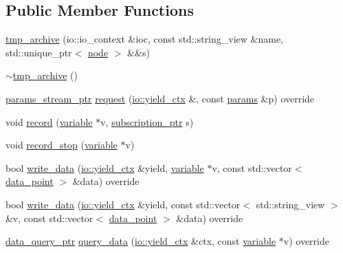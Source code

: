 \subsection*{Public Member Functions}
\begin{DoxyCompactItemize}
\item 
\hyperlink{classtelegraph_1_1tmp__archive_a38157c35014a713c871fda88651c7318}{tmp\+\_\+archive} (io\+::io\+\_\+context \&ioc, const std\+::string\+\_\+view \&name, std\+::unique\+\_\+ptr$<$ \hyperlink{classtelegraph_1_1node}{node} $>$ \&\&s)
\item 
\hyperlink{classtelegraph_1_1tmp__archive_aef321341a53bb0ff5c0c3bd6df3290de}{$\sim$tmp\+\_\+archive} ()
\item 
\hyperlink{namespacetelegraph_ad071241508ea0f86c7de0686016f9ca9}{params\+\_\+stream\+\_\+ptr} \hyperlink{classtelegraph_1_1tmp__archive_a688a661b85092244e5634f9c3e380f94}{request} (\hyperlink{structboost_1_1asio_1_1yield__ctx}{io\+::yield\+\_\+ctx} \&, const \hyperlink{classtelegraph_1_1params}{params} \&p) override
\item 
void \hyperlink{classtelegraph_1_1tmp__archive_a6c71e7bf706d35c3e751e0bc7c8555b9}{record} (\hyperlink{classtelegraph_1_1variable}{variable} $\ast$v, \hyperlink{namespacetelegraph_a58641aa5b1a2cbdb0431916a87069f64}{subscription\+\_\+ptr} s)
\item 
void \hyperlink{classtelegraph_1_1tmp__archive_a92ecdf029db73b48ca0d7eaf2838a492}{record\+\_\+stop} (\hyperlink{classtelegraph_1_1variable}{variable} $\ast$v)
\item 
bool \hyperlink{classtelegraph_1_1tmp__archive_ae1838ff3fc3f1cd0eab31535a2f2e974}{write\+\_\+data} (\hyperlink{structboost_1_1asio_1_1yield__ctx}{io\+::yield\+\_\+ctx} \&yield, \hyperlink{classtelegraph_1_1variable}{variable} $\ast$v, const std\+::vector$<$ \hyperlink{classtelegraph_1_1data__point}{data\+\_\+point} $>$ \&data) override
\item 
bool \hyperlink{classtelegraph_1_1tmp__archive_a228c2c681beb749268d09cd83d594246}{write\+\_\+data} (\hyperlink{structboost_1_1asio_1_1yield__ctx}{io\+::yield\+\_\+ctx} \&yield, const std\+::vector$<$ std\+::string\+\_\+view $>$ \&v, const std\+::vector$<$ \hyperlink{classtelegraph_1_1data__point}{data\+\_\+point} $>$ \&data) override
\item 
\hyperlink{namespacetelegraph_a6ffe775ac48dca2a4013b53d692199c8}{data\+\_\+query\+\_\+ptr} \hyperlink{classtelegraph_1_1tmp__archive_a7f2d18d2a4c9a7fd65d9752c8f4ce4d5}{query\+\_\+data} (\hyperlink{structboost_1_1asio_1_1yield__ctx}{io\+::yield\+\_\+ctx} \&ctx, const \hyperlink{classtelegraph_1_1variable}{variable} $\ast$v) override

\end{DoxyCompactItemize}

